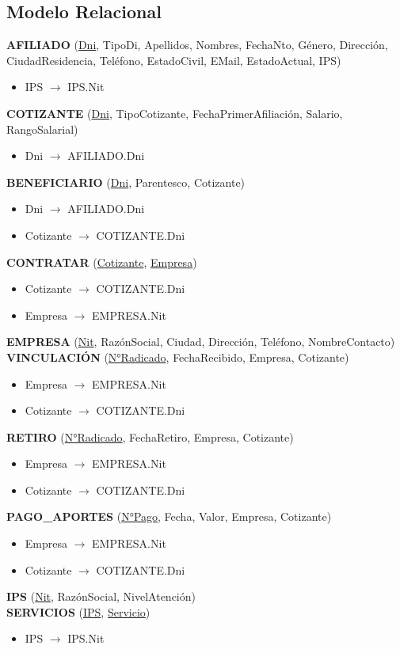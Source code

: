 \documentclass[12pt,a4paper]{article}
\begin{document}
\subsection{Modelo Relacional}
\begin{tcolorbox}[title=Modelo Relacional]
\textbf{AFILIADO} (\underline{Dni}, TipoDi, Apellidos, Nombres, FechaNto, Género, Dirección, CiudadResidencia, Teléfono, EstadoCivil, EMail, EstadoActual, IPS)
\begin{itemize}
\item IPS $\rightarrow$ IPS.Nit
\end{itemize}
\textbf{COTIZANTE} (\underline{Dni}, TipoCotizante, FechaPrimerAfiliación, Salario, RangoSalarial)
\begin{itemize}
\item Dni $\rightarrow$ AFILIADO.Dni
\end{itemize}
\textbf{BENEFICIARIO} (\underline{Dni}, Parentesco, Cotizante)
\begin{itemize}
\item Dni $\rightarrow$ AFILIADO.Dni
\item Cotizante $\rightarrow$ COTIZANTE.Dni
\end{itemize}
\textbf{CONTRATAR} (\underline{Cotizante}, \underline{Empresa})
\begin{itemize}
\item Cotizante $\rightarrow$ COTIZANTE.Dni
\item Empresa $\rightarrow$ EMPRESA.Nit
\end{itemize}
\textbf{EMPRESA} (\underline{Nit}, RazónSocial, Ciudad, Dirección, Teléfono, NombreContacto)\\

\textbf{VINCULACIÓN} (\underline{N°Radicado}, FechaRecibido, Empresa, Cotizante)
\begin{itemize}
\item Empresa $\rightarrow$ EMPRESA.Nit
\item Cotizante $\rightarrow$ COTIZANTE.Dni
\end{itemize}
\textbf{RETIRO} (\underline{N°Radicado}, FechaRetiro, Empresa, Cotizante)
\begin{itemize}
\item Empresa $\rightarrow$ EMPRESA.Nit
\item Cotizante $\rightarrow$ COTIZANTE.Dni
\end{itemize}
\textbf{PAGO\_APORTES} (\underline{N°Pago}, Fecha, Valor, Empresa, Cotizante)
\begin{itemize}
\item Empresa $\rightarrow$ EMPRESA.Nit
\item Cotizante $\rightarrow$ COTIZANTE.Dni
\end{itemize}
\textbf{IPS} (\underline{Nit}, RazónSocial, NivelAtención)\\

\textbf{SERVICIOS} (\underline{IPS}, \underline{Servicio})
\begin{itemize}
\item IPS $\rightarrow$ IPS.Nit
\end{itemize}
\end{tcolorbox}
\end{document}
